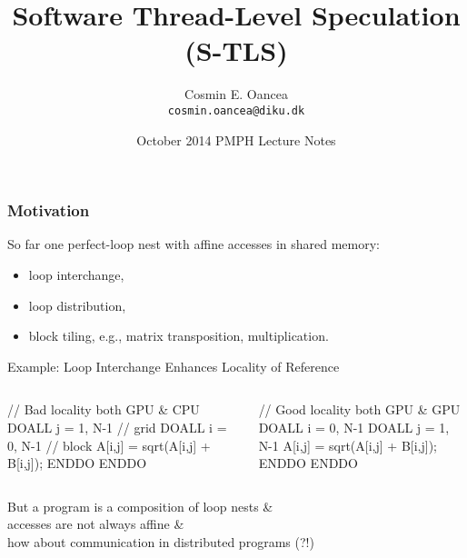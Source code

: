 \documentclass{beamer}
\title[S-TLS]{Software Thread-Level Speculation (S-TLS)}
\author[C.~Oancea]{Cosmin E. Oancea\\{\tt cosmin.oancea@diku.dk}}
\institute{Department of Computer Science (DIKU)\\University of Copenhagen}
\date[Oct'14]{October 2014 PMPH Lecture Notes}
\newcommand{\emphh}[1]{\textcolor{CosGreen}{ #1}}
\begin{document}
\titleslide




\begin{frame}[fragile,t]
  \frametitle{Motivation}

\emphh{So far one perfect-loop nest with affine accesses in shared memory}:
\begin{itemize}
    \item loop interchange,
    \item loop distribution,
    \item block tiling, e.g., matrix transposition, multiplication.
\end  {itemize}\bigskip

\begin{block}{Example: Loop Interchange Enhances Locality of Reference}
\begin{columns}
\begin{colorcode}
// Bad locality both GPU \& CPU
\emphh{DOALL j = 1, N-1} // grid
  \emphh{DOALL i = 0, N-1} // block
    A[i,j] = sqrt(A[i,j] + B[i,j]);
  ENDDO
ENDDO
\end{colorcode}
\begin{colorcode}
// Good locality both GPU \& GPU
\emphh{DOALL i = 0, N-1}
  \emphh{DOALL j = 1, N-1}    
    A[i,j] = sqrt(A[i,j] + B[i,j]);
  ENDDO
ENDDO
\end{colorcode}
\end{columns}
\end{block} 
 
\alert{But a program is a composition of loop nests \&\\ 
accesses are not always affine \&\\
how about communication in distributed programs (?!)}

\end{frame}


\begin{frame}[fragile]
	\tableofcontents
\end{frame}
\end{document}
